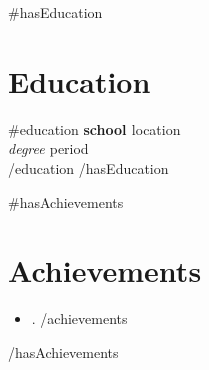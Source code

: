 \documentclass[letterpaper,11pt]{article}
\begin{document}
{{#hasEducation}}
\section{Education}
{{#education}}
\textbf{ {{ school }} } \hfill {{ location }}\\
\textit{ {{ degree }} } \hfill {{ period }}\\[4pt]
{{/education}}
{{/hasEducation}}

{{#hasAchievements}}
\section{Achievements}
\begin{itemize}
{{#achievements}}\item {{ . }}
{{/achievements}}\end{itemize}
{{/hasAchievements}}
\end{document}
